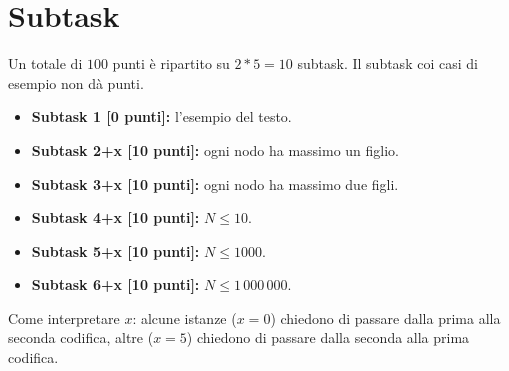 \documentclass[a4paper,11pt]{article}
\begin{document}
\section*{Subtask}
Un totale di $100$ punti \`e ripartito su $2*5=10$ subtask.
Il subtask coi casi di esempio non dà punti.
\begin{itemize}
\item \textbf{Subtask 1 [0 punti]:} l'esempio del testo.
\item \textbf{Subtask 2+x [10 punti]:} ogni nodo ha massimo un figlio.
\item \textbf{Subtask 3+x [10 punti]:} ogni nodo ha massimo due figli.
\item \textbf{Subtask 4+x [10 punti]:} $N \le 10$.
\item \textbf{Subtask 5+x [10 punti]:} $N \le 1000$.
\item \textbf{Subtask 6+x [10 punti]:} $N \le 1\,000\,000$.
\end{itemize}
Come interpretare $x$: alcune istanze ($x=0$) chiedono di passare dalla prima alla seconda codifica,
altre ($x=5$) chiedono di passare dalla seconda alla prima codifica.
\end{document}
